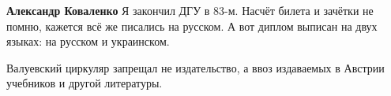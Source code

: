 \begin{itemize}
\begin{itemize}
\textbf{Александр Коваленко} Я закончил ДГУ в 83-м. Насчёт билета и зачётки не помню, кажется всё же писались на русском. А вот диплом выписан на двух языках: на русском и украинском.
\end{itemize}

 
Валуевский циркуляр запрещал не издательство, а ввоз издаваемых в Австрии
учебников и другой литературы.

\end{itemize}

